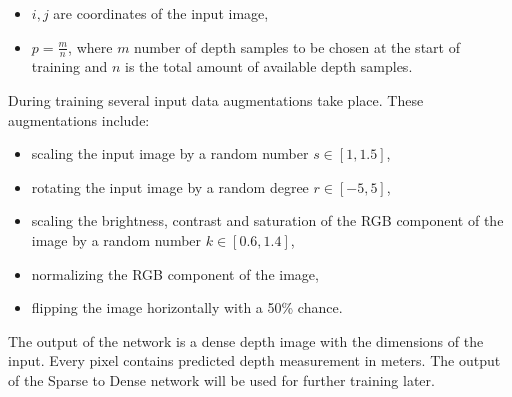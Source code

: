 \documentclass[twoside]{ctuthesis}
\theoremstyle{plain}
\theoremstyle{definition}
\theoremstyle{note}
\begin{document}
\begin{itemize}
	\item $i,j$ are coordinates of the input image,
	\item $p=\frac{m}{n}$, where $m$ number of depth samples to be chosen at the start of training and $n$ is the total amount of available depth samples.
\end{itemize}
During training several input data augmentations take place. These augmentations include:
\begin{itemize}
	\item scaling the input image by a random number $s\in[1,1.5]$,
	\item rotating the input image by a random degree $r\in[-5,5]$,
	\item scaling the brightness, contrast and saturation of the RGB component of the image by a random number $k\in[0.6,1.4]$,
	\item normalizing the RGB component of the image,
	\item flipping the image horizontally with a 50\% chance.
\end{itemize}
The output of the network is a dense depth image with the dimensions of the input. Every pixel contains predicted depth measurement in meters. The output of the Sparse to Dense network will be used for further training later.
\end{document}
